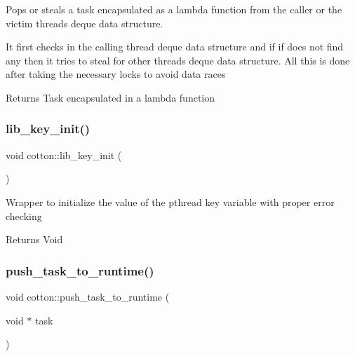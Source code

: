 Pops or steals a task encapsulated as a lambda function from the caller or the victim thread\textquotesingle{}s deque data structure.

It first checks in the calling thread deque data structure and if if does not find any then it tries to steal for other threads\textquotesingle{} deque data structure. All this is done after taking the necessary locks to avoid data races

\begin{DoxyReturn}{Returns}
Task encapsulated in a lambda function 
\end{DoxyReturn}
\mbox{\label{cotton-runtime_8h_file_a4ea9036584fa3bd86fe8626dc05d295f}} 
\subsubsection{\texorpdfstring{lib\+\_\+key\+\_\+init()}{lib\_key\_init()}}
{\footnotesize\ttfamily void cotton\+::lib\+\_\+key\+\_\+init (\begin{DoxyParamCaption}{ }\end{DoxyParamCaption})}

Wrapper to initialize the value of the pthread key variable with proper error checking

\begin{DoxyReturn}{Returns}
Void 
\end{DoxyReturn}
\mbox{\label{cotton-runtime_8h_file_a803285410d295a5f32238ad2dfc241a5}} 
\subsubsection{\texorpdfstring{push\+\_\+task\+\_\+to\+\_\+runtime()}{push\_task\_to\_runtime()}}
{\footnotesize\ttfamily void cotton\+::push\+\_\+task\+\_\+to\+\_\+runtime (\begin{DoxyParamCaption}\item[{void $\ast$}]{task }\end{DoxyParamCaption})}

